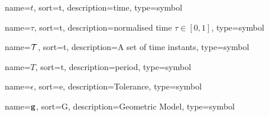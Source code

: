 	\newcommand{\pathsym}{\traj}


	{%
		name={\ensuremath{t}},
		sort=t,
		description=time,
		type=symbol
	}
	\newcommand{\timesym}{\gls{sym:time}}

	{%
		name={\ensuremath{\tau}},
		sort=t,
		description=normalised time \ensuremath{\tau \in [0, 1]},
		type=symbol
	}
	\newcommand{\timenorm}{\gls{sym:timenorm}}

	{%
		name={\ensuremath{\set{T}}},
		sort=t,
		description=A set of time instants,
		type=symbol
	}
	\newcommand{\setoftimeinstants}{\gls{sym:setoftimeinstants}}

	{%
		name={\ensuremath{T}},
		sort=t,
		description=period,
		type=symbol
	}
	\newcommand{\period}{\gls{sym:period}}

	{%
		name={\ensuremath{\epsilon}},
		sort=e,
		description=Tolerance,
		type=symbol
	}
	\newcommand{\tol}{\gls{sym:tolerance}}

	{%
		name={\ensuremath{\vecfunc{g}}},
		sort=G,
		description=Geometric Model,
		type=symbol
	}
	\newcommand{\geometricmodel}{\gls{sym:geometricmodel}}

